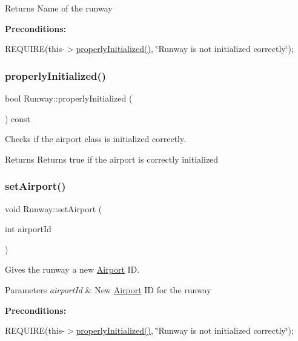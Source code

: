 \begin{DoxyReturn}{Returns}
Name of the runway
\end{DoxyReturn}
{\bfseries Preconditions\+:}
\begin{DoxyItemize}
\item R\+E\+Q\+U\+I\+RE(this-\/$>$\mbox{\hyperlink{class_runway_a360d98246cabf3aa929765f81a656348}{properly\+Initialized()}}, \char`\"{}\+Runway is not initialized correctly\char`\"{}); 
\end{DoxyItemize}\mbox{\label{class_runway_a360d98246cabf3aa929765f81a656348}} 
\subsubsection{\texorpdfstring{properly\+Initialized()}{properlyInitialized()}}
{\footnotesize\ttfamily bool Runway\+::properly\+Initialized (\begin{DoxyParamCaption}{ }\end{DoxyParamCaption}) const}



Checks if the airport class is initialized correctly. 

\begin{DoxyReturn}{Returns}
Returns true if the airport is correctly initialized 
\end{DoxyReturn}
\mbox{\label{class_runway_a6614626321a1f4c33f24800cbe78d330}} 
\subsubsection{\texorpdfstring{set\+Airport()}{setAirport()}}
{\footnotesize\ttfamily void Runway\+::set\+Airport (\begin{DoxyParamCaption}\item[{int}]{airport\+Id }\end{DoxyParamCaption})}



Gives the runway a new \mbox{\hyperlink{class_airport}{Airport}} ID. 


\begin{DoxyParams}{Parameters}
{\em airport\+Id} & New \mbox{\hyperlink{class_airport}{Airport}} ID for the runway\\
\hline
\end{DoxyParams}
{\bfseries Preconditions\+:}
\begin{DoxyItemize}
\item R\+E\+Q\+U\+I\+RE(this-\/$>$\mbox{\hyperlink{class_runway_a360d98246cabf3aa929765f81a656348}{properly\+Initialized()}}, \char`\"{}\+Runway is not initialized correctly\char`\"{}); 
\end{DoxyItemize}\mbox{\label{class_runway_af587fc8f841c10a99427cf7a0f442fce}} 
